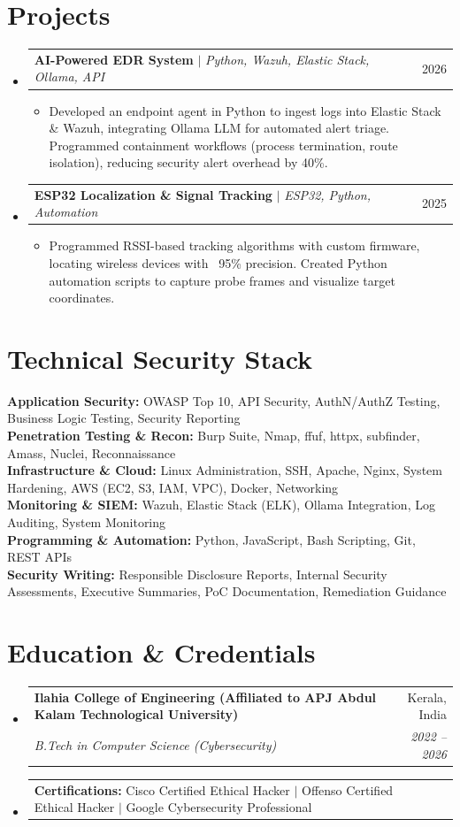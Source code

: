 \documentclass[letterpaper,10pt]{article}
\makeatletter
\newcommand{\resumeItem}[1]{
  \item\small{
    {#1 \vspace{-2pt}}
  }
}
\newcommand{\resumeSubheading}[4]{
  \vspace{-1pt}\item
    \begin{tabular*}{0.97\textwidth}[t]{l@{\extracolsep{\fill}}r}
      \textbf{#1} & #2 \\
      \textit{\small#3} & \textit{\small #4} \\
    \end{tabular*}\vspace{-5pt}
}
\newcommand{\resumeProjectHeading}[2]{
    \item
    \begin{tabular*}{0.97\textwidth}{l@{\extracolsep{\fill}}r}
      \small#1 & #2 \\
    \end{tabular*}\vspace{-5pt}
}
\newcommand{\resumeSubHeadingListStart}{\begin{itemize}[leftmargin=0.15in, label={}]}
\newcommand{\resumeSubHeadingListEnd}{\end{itemize}}
\newcommand{\resumeItemListStart}{\begin{itemize}}
\newcommand{\resumeItemListEnd}{\end{itemize}\vspace{-5pt}}
\makeatother
\begin{document}
\section{Projects}
  \resumeSubHeadingListStart
    \resumeProjectHeading
      {\textbf{AI-Powered EDR System} $|$ \emph{Python, Wazuh, Elastic Stack, Ollama, API}}{2026}
      \resumeItemListStart
        \resumeItem{Developed an endpoint agent in Python to ingest logs into Elastic Stack \& Wazuh, integrating Ollama LLM for automated alert triage. Programmed containment workflows (process termination, route isolation), reducing security alert overhead by 40\%.}
      \resumeItemListEnd
    \resumeProjectHeading
      {\textbf{ESP32 Localization \& Signal Tracking} $|$ \emph{ESP32, Python, Automation}}{2025}
      \resumeItemListStart
        \resumeItem{Programmed RSSI-based tracking algorithms with custom firmware, locating wireless devices with ~95\% precision. Created Python automation scripts to capture probe frames and visualize target coordinates.}
      \resumeItemListEnd
  \resumeSubHeadingListEnd

\section{Technical Security Stack}
 \begin{itemize}[leftmargin=0.15in, label={}]
    \small{\item{
     \textbf{Application Security:} OWASP Top 10, API Security, AuthN/AuthZ Testing, Business Logic Testing, Security Reporting \\
     \textbf{Penetration Testing \& Recon:} Burp Suite, Nmap, ffuf, httpx, subfinder, Amass, Nuclei, Reconnaissance \\
     \textbf{Infrastructure \& Cloud:} Linux Administration, SSH, Apache, Nginx, System Hardening, AWS (EC2, S3, IAM, VPC), Docker, Networking \\
     \textbf{Monitoring \& SIEM:} Wazuh, Elastic Stack (ELK), Ollama Integration, Log Auditing, System Monitoring \\
     \textbf{Programming \& Automation:} Python, JavaScript, Bash Scripting, Git, REST APIs \\
     \textbf{Security Writing:} Responsible Disclosure Reports, Internal Security Assessments, Executive Summaries, PoC Documentation, Remediation Guidance
    }}
 \end{itemize}

\section{Education \& Credentials}
  \resumeSubHeadingListStart
    \resumeSubheading
      {Ilahia College of Engineering (Affiliated to APJ Abdul Kalam Technological University)}{Kerala, India}
      {B.Tech in Computer Science (Cybersecurity)}{2022 -- 2026}
    \resumeProjectHeading
      {\textbf{Certifications:} Cisco Certified Ethical Hacker $|$ Offenso Certified Ethical Hacker $|$ Google Cybersecurity Professional}{}
  \resumeSubHeadingListEnd
\end{document}
